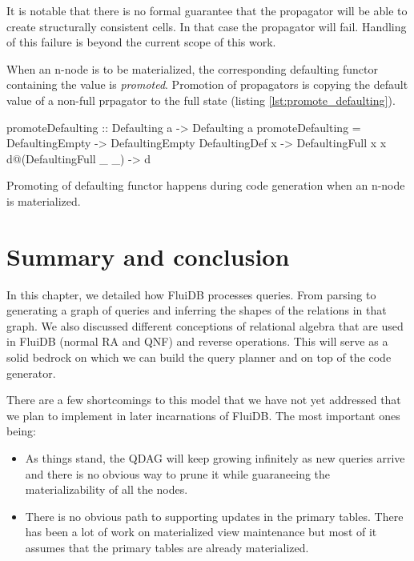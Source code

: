 It is notable that there is no formal guarantee that the propagator
will be able to create structurally consistent cells. In that case the
propagator will fail. Handling of this failure is beyond the current
scope of this work.

When an n-node is to be materialized, the corresponding defaulting
functor containing the value is \emph{promoted}.  Promotion of
propagators is copying the default value of a non-full prpagator to
the full state (listing \ref{lst:promote_defaulting}).


\begin{code}
  \begin{haskellcode}
    promoteDefaulting :: Defaulting a -> Defaulting a
    promoteDefaulting = \case
      DefaultingEmpty        -> DefaultingEmpty
      DefaultingDef x        -> DefaultingFull x x
      d@(DefaultingFull _ _) -> d
  \end{haskellcode}

  \caption{\label{lst:promote_defaulting}Promoting of defaulting functor happens
    during code generation when an n-node is materialized.}
\end{code}

\section{Summary and conclusion}

In this chapter, we detailed how FluiDB processes queries. From
parsing to generating a graph of queries and inferring the shapes of
the relations in that graph. We also discussed different conceptions
of relational algebra that are used in FluiDB (normal RA and QNF) and
reverse operations. This will serve as a solid bedrock on which we can
build the query planner and on top of the code generator.

There are a few shortcomings to this model that we have not yet
addressed that we plan to implement in later incarnations of
FluiDB. The most important ones being:

\begin{itemize}
\item As things stand, the QDAG will keep growing infinitely as new
  queries arrive and there is no obvious way to prune it while
  guaraneeing the materializability of all the nodes.
\item There is no obvious path to supporting updates in the primary
  tables. There has been a lot of work on materialized view
  maintenance but most of it assumes that the primary tables are
  already materialized.
\end{itemize}
